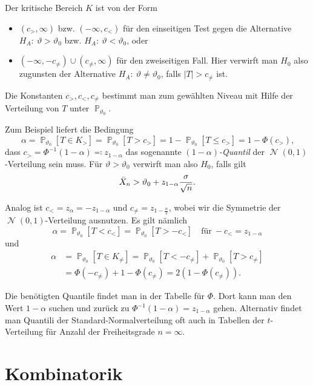 \documentclass[a4paper,10pt]{article}
\renewcommand{\P}{\operatorname{\mathbb{P}}}
\DeclareMathOperator{\normal}{\mathcal{N}}
\numberwithin{equation}{section}
\begin{document}
Der kritische Bereich \( K \) ist von der Form
\begin{itemize}
    \item \( (c_>, \infty) \) bzw. \( (-\infty, c_<) \) für den einseitigen Test gegen die Alternative \( H_A: \: \vartheta > \vartheta_0 \) bzw. \( H_A: \: \vartheta < \vartheta_0 \), oder
    \item \( (-\infty, -c_{\neq}) \cup (c_{\neq}, \infty) \) für den zweiseitigen Fall. Hier verwirft man \( H_0 \) also zugunsten der Alternative \( H_A: \: \vartheta \neq \vartheta_0 \), falls \( |T| > c_{\neq} \) ist.
\end{itemize}

Die Konstanten \( c_>, c_<, c_{\neq} \) bestimmt man zum gewählten Niveau mit Hilfe der Verteilung von \( T \) unter \( \P_{\vartheta_0} \).

Zum Beispiel liefert die Bedingung
\[
    \alpha = \P_{\vartheta_0}[T \in K_>] = \P_{\vartheta_0}[T > c_>] = 1 - \P_{\vartheta_0}[T \leq c_>] = 1 - \Phi(c_>) \text{,}
\]
dass \( c_> = \Phi^{-1}(1 - \alpha) \eqqcolon z_{1 - \alpha} \) das sogenannte \emph{\( (1 - \alpha) \)-Quantil} der \( \normal(0, 1) \)-Verteilung sein muss. Für \( \vartheta > \vartheta_0 \) verwirft man also \( H_0 \), falls gilt
\[
    \Bar{X}_n > \vartheta_0 + z_{1 - \alpha} \frac{\sigma}{\sqrt{n}} \text{.}
\]

Analog ist \( c_< = z_\alpha = -z_{1 - \alpha} \) und \( c_{\neq} = z_{1 - \frac{\alpha}{2}} \), wobei wir die Symmetrie der \( \normal(0, 1) \)-Verteilung ausnutzen. Es gilt nämlich
\[
    \alpha = \P_{\vartheta_0}[T < c_<] = \P_{\vartheta_0}[T > -c_<] \quad \text{für} \ -c_< = z_{1 - \alpha}
\]
und
\[
    \begin{split}
        \alpha &= \P_{\vartheta_0}[T \in K_{\neq}] = \P_{\vartheta_0}[T < -c_{\neq}] + \P_{\vartheta_0}[T > c_{\neq}] \\
        &= \Phi(-c_{\neq}) + 1 - \Phi(c_{\neq}) = 2(1 - \Phi(c_{\neq})) \text{.}
    \end{split}
\]

Die benötigten Quantile findet man in der Tabelle für \( \Phi \).
Dort kann man den Wert \( 1 - \alpha \) suchen und zurück zu \( \Phi^{-1}(1 - \alpha) = z_{1 - \alpha} \) gehen.
Alternativ findet man Quantili der Standard-Normalverteilung oft auch in Tabellen der \( t \)-Verteilung für Anzahl der Freiheitsgrade \( n = \infty \).


\footnotesize
\section{Kombinatorik}
\end{document}
